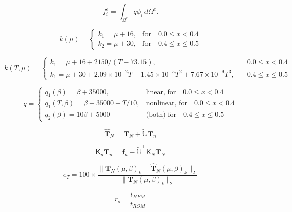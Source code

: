 \documentclass[11pt]{article}
\renewcommand{\vec}[1]{\mathbf{#1}}
\newcommand{\mat}[1]{\mathsf{#1}}
\begin{document}
\begin{equation}
{f}^e_i = \int_{{\Omega}^e} q \phi_i \, d\Omega^{e}.
\label{eq:f_N_ij}
\end{equation}

\begin{equation}
k(\mu) = 
\begin{cases} 
k_1 = \mu + 16, & \text{for} \quad 0.0 \leq x < 0.4   \\ 
k_2 = \mu + 30, & \text{for} \quad 0.4 \leq x \leq 0.5   
\end{cases}
\label{eq:k_mu_L}
\end{equation}

\begin{equation}
k(T,\mu) = 
\begin{cases} 
k_1 =\mu + 16 + 2150/(T - 73.15),  &\quad 0.0 \leq x < 0.4 \\ 
k_1 =\mu + 30 + 2.09 \times 10^{-2} T - 1.45 \times 10^{-5} T^2 + 7.67 \times 10^{-9} T^3, & \quad 0.4 \leq x \leq 0.5 
\end{cases}
\label{eq:k_mu_NL}
\end{equation}

\begin{equation}
q= 
\begin{cases} 
q_1(\beta) = \beta + 35000, & \text{linear, for} \quad 0.0 \leq x < 0.4 \\ 
q_1(T,\beta) = \beta + 35000 + T/10, & \text{nonlinear, for} \quad 0.0 \leq x < 0.4 \\ 
q_2(\beta) = 10\beta + 5000 & \text{(both) for} \quad 0.4 \leq x \leq 0.5 
\end{cases}
\label{eq:q_beta}
\end{equation}

\begin{equation}
\widehat{\vec{T}}_N = \overline{\vec{T}}_N + \mathbb{\widetilde{U}} \vec{T}_n
\label{eq:T_rec}
\end{equation}

\begin{equation}
\mat{K}_n\vec{T}_n = \vec{f}_n- \widetilde{\mathbb{U}}^\top \mat{K}_N\overline{\vec{T}}_N 
\label{eq:HC_ROM}
\end{equation}

\begin{equation}
e_T = 100\times\dfrac{\|\vec{T}_{N}(\mu,\beta)_k-\widehat{\vec{T}}_N(\mu,\beta)_k\|_2}{\|\vec{T}_{N}(\mu,\beta)_k\|_2}
\label{eq:rom_error}
\end{equation}

\begin{equation}
r_s = \dfrac{t_{HFM}}{t_{ROM}}
\label{eq:rom_speedup}
\end{equation}
\end{document}
